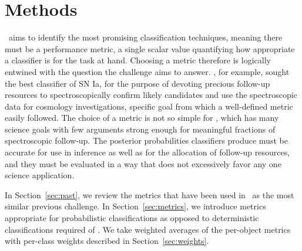 \section{Methods}
\label{sec:methods}


\plasticc\ aims to identify the most promising classification techniques, meaning there must be a performance metric, a single scalar value quantifying how appropriate a classifier is for the task at hand.
Choosing a metric therefore is logically entwined with the question the challenge aims to answer.
\snphotcc, for example, sought the best classifier of SN Ia, for the purpose of devoting precious follow-up resources to spectroscopically confirm likely candidates and use the spectroscopic data for cosmology investigations, specific goal from which a well-defined metric easily followed.
The choice of a metric is not so simple for \plasticc, which has many science goals with few arguments strong enough for meaningful fractions of spectroscopic follow-up.
The posterior probabilities classifiers produce must be accurate for use in inference as well as for the allocation of follow-up resources, and they must be evaluated in a way that does not excessively favor any one science application.

In Section~\ref{sec:past}, we review the metrics that have been used in \snphotcc\ as the most similar previous challenge.
In Section~\ref{sec:metrics}, we introduce metrics appropriate for probabilistic classifications as opposed to deterministic classifications required of \snphotcc.
We take weighted averages of the per-object metrics with per-class weights described in Section~\ref{sec:weights}.

